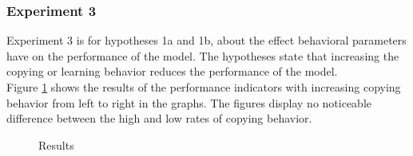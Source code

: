 \documentclass[a4paper]{article}
\begin{document}
\subsubsection{Experiment 3}
Experiment 3 is for hypotheses 1a and 1b, about the effect behavioral parameters have on the performance of the model. 
The hypotheses state that increasing the copying or learning behavior reduces the performance of the model.\\
Figure \ref{Result_exp_3_1} shows the results of the performance indicators with increasing copying behavior from left to right in the 
graphs. The figures display no noticeable difference between the high and low rates of copying behavior. \\
\begin{figure}[!ht]
\caption{Results}
\label{Result_exp_3_1}
\end{figure} \\
\end{document}
